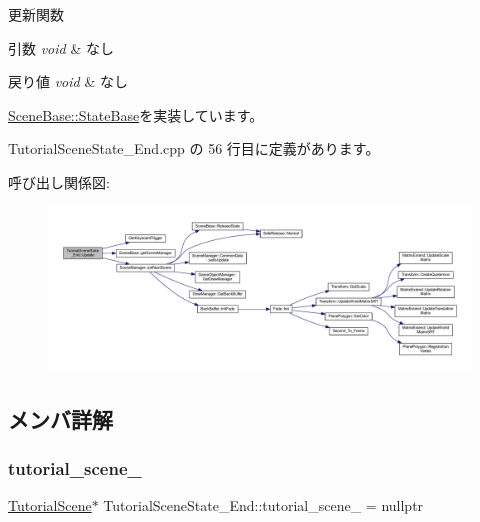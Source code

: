更新関数 


\begin{DoxyParams}{引数}
{\em void} & なし \\
\hline
\end{DoxyParams}

\begin{DoxyRetVals}{戻り値}
{\em void} & なし \\
\hline
\end{DoxyRetVals}


\mbox{\hyperlink{class_scene_base_1_1_state_base_ad2c6c8fd9f020eb02f64f394edee129c}{Scene\+Base\+::\+State\+Base}}を実装しています。



 Tutorial\+Scene\+State\+\_\+\+End.\+cpp の 56 行目に定義があります。

呼び出し関係図\+:
\nopagebreak
\begin{figure}[H]
\begin{center}
\leavevmode
\includegraphics[width=350pt]{class_tutorial_scene_state___end_a7cdf03fa9a0e41ab86c2b41b8165ad09_cgraph}
\end{center}
\end{figure}


\subsection{メンバ詳解}
\mbox{\label{class_tutorial_scene_state___end_a68f36e80b530182a5b5d835425b7e829}} 
\subsubsection{\texorpdfstring{tutorial\+\_\+scene\+\_\+}{tutorial\_scene\_}}
{\footnotesize\ttfamily \mbox{\hyperlink{class_tutorial_scene}{Tutorial\+Scene}}$\ast$ Tutorial\+Scene\+State\+\_\+\+End\+::tutorial\+\_\+scene\+\_\+ = nullptr\hspace{0.3cm}{\ttfamily [protected]}}



